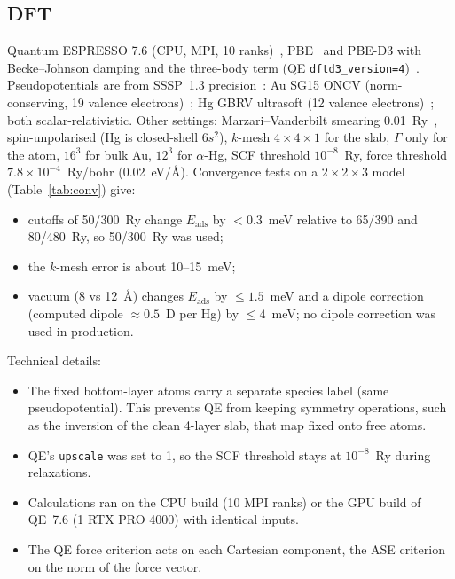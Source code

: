\documentclass[11pt,a4paper]{article}
\newcommand{\Eads}{E_\mathrm{ads}}
\begin{document}
\subsection{DFT}
Quantum ESPRESSO 7.6 (CPU, MPI, 10 ranks)~\cite{qe2009,qe2017}, PBE~\cite{pbe} and PBE-D3 with Becke--Johnson damping and the three-body term (QE \texttt{dftd3\_version=4})~\cite{d3,d3bj}. Pseudopotentials are from SSSP~1.3 precision~\cite{sssp}: Au SG15 ONCV (norm-conserving, 19 valence electrons)~\cite{oncv,sg15}; Hg GBRV ultrasoft (12 valence electrons)~\cite{gbrv}; both scalar-relativistic. Other settings: Marzari--Vanderbilt smearing 0.01~Ry~\cite{mv}, spin-unpolarised (Hg is closed-shell $6s^2$), $k$-mesh $4\times4\times1$ for the slab, $\Gamma$ only for the atom, $16^3$ for bulk Au, $12^3$ for $\alpha$-Hg, SCF threshold $10^{-8}$~Ry, force threshold $7.8\times10^{-4}$~Ry/bohr (0.02~eV/\AA). Convergence tests on a $2\times2\times3$ model (Table~\ref{tab:conv}) give:
\begin{itemize}
\item cutoffs of 50/300~Ry change $\Eads$ by $<0.3$~meV relative to 65/390 and 80/480~Ry, so 50/300~Ry was used;
\item the $k$-mesh error is about 10--15~meV;
\item vacuum (8 vs 12~\AA) changes $\Eads$ by $\le1.5$~meV and a dipole correction (computed dipole $\approx0.5$~D per Hg) by $\le4$~meV; no dipole correction was used in production.
\end{itemize}
Technical details:
\begin{itemize}
\item The fixed bottom-layer atoms carry a separate species label (same pseudopotential). This prevents QE from keeping symmetry operations, such as the inversion of the clean 4-layer slab, that map fixed onto free atoms.
\item QE's \texttt{upscale} was set to 1, so the SCF threshold stays at $10^{-8}$~Ry during relaxations.
\item Calculations ran on the CPU build (10 MPI ranks) or the GPU build of QE~7.6 (1 RTX PRO 4000) with identical inputs.
\item The QE force criterion acts on each Cartesian component, the ASE criterion on the norm of the force vector.
\end{itemize}

\begin{table}[h]
\centering
\caption{DFT convergence tests (PBE unless noted) on a rigid $2\times2\times3$ test model at 1/4~ML; energies in eV. The $k$-meshes $4\times4$, $6\times6$, $9\times9$ on the $2\times2$ cell correspond to about $2.7\times2.7$, $4\times4$ and $6\times6$ on the $3\times3$ production cell.}
\label{tab:conv}
\small

\end{table}
\end{document}
